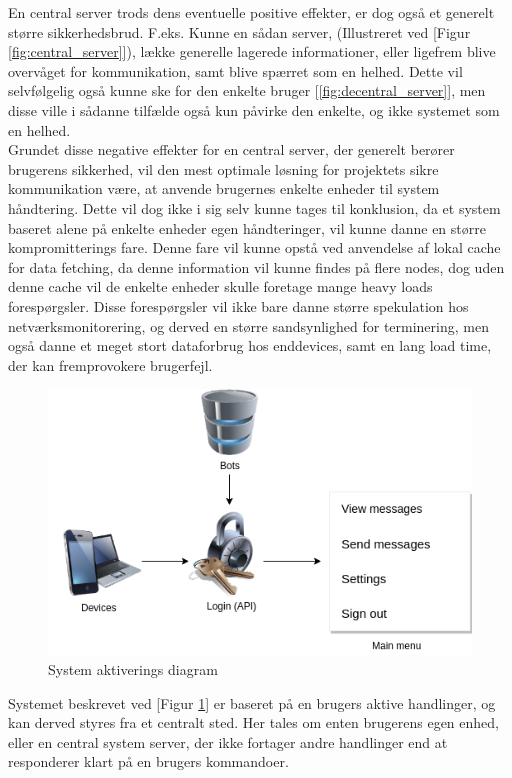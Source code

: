 En central server trods dens eventuelle positive effekter, er dog også et generelt større sikkerhedsbrud. F.eks. Kunne en sådan server, (Illustreret ved [Figur \ref{fig:central_server}]), lække generelle lagerede informationer, eller ligefrem blive overvåget for kommunikation, samt blive spærret som en helhed. Dette vil selvfølgelig også kunne ske for den enkelte bruger [\ref{fig:decentral_server}], men disse ville i sådanne tilfælde også kun påvirke den enkelte, og ikke systemet som en helhed.\\
Grundet disse negative effekter for en central server, der generelt berører brugerens sikkerhed, vil den mest optimale løsning for projektets sikre kommunikation være, at anvende brugernes enkelte enheder til system håndtering. Dette vil dog ikke i sig selv kunne tages til konklusion, da et system baseret alene på enkelte enheder egen håndteringer, vil kunne danne en større kompromitterings fare. Denne fare vil kunne opstå ved anvendelse af lokal cache for data fetching, da denne information vil kunne findes på flere nodes, dog uden denne cache vil de enkelte enheder skulle foretage mange heavy loads forespørgsler. Disse forespørgsler vil ikke bare danne større spekulation hos netværksmonitorering, og derved en større sandsynlighed for terminering, men også danne et meget stort dataforbrug hos enddevices, samt en lang load time, der kan fremprovokere brugerfejl.



\begin{figure}[H]
    \centering
    \includegraphics[width=0.75\linewidth]{Projectdoc/Assets/Illustrationer/simple-system.png}
    \caption{System aktiverings diagram}
    \label{fig:sysdiagram}
\end{figure}
Systemet beskrevet ved [Figur \ref{fig:sysdiagram}] er baseret på en brugers aktive handlinger, og kan derved styres fra et centralt sted. Her tales om enten brugerens egen enhed, eller en central system server, der ikke fortager andre handlinger end at responderer klart på en brugers kommandoer.

